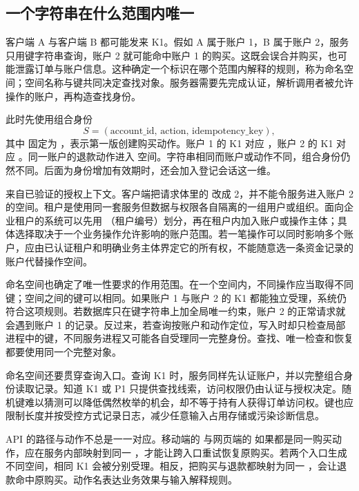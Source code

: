 \subsection*{一个字符串在什么范围内唯一}

客户端 A 与客户端 B 都可能发来 K1。假如 A 属于账户 1，B 属于账户 2，服务只用键字符串查询，账户 2 就可能命中账户 1 的购买。这既会误合并购买，也可能泄露订单与账户信息。这种确定一个标识在哪个范围内解释的规则，称为命名空间；空间名称与键共同决定查找对象。服务器需要先完成认证，解析调用者被允许操作的账户，再构造查找身份。

此时先使用组合身份
\[
 S=(\mathrm{account\_id},\,\mathrm{action},\,\mathrm{idempotency\_key}),
\]
其中  固定为 ，表示第一版创建购买动作。账户 1 的 K1 对应 ，账户 2 的 K1 对应 。同一账户的退款动作进入  空间。字符串相同而账户或动作不同，组合身份仍然不同。后面为身份增加有效期时，还会加入登记会话这一维。

 来自已验证的授权上下文。客户端把请求体里的  改成 2，并不能令服务进入账户 2 的空间。租户是使用同一套服务但数据与权限各自隔离的一组用户或组织。面向企业租户的系统可以先用 （租户编号）划分，再在租户内加入账户或操作主体；具体选择取决于一个业务操作允许影响的账户范围。若一笔操作可以同时影响多个账户，应由已认证租户和明确业务主体界定它的所有权，不能随意选一条资金记录的账户代替操作空间。



命名空间也确定了唯一性要求的作用范围。在一个空间内，不同操作应当取得不同键；空间之间的键可以相同。如果账户 1 与账户 2 的 K1 都能独立受理，系统仍符合这项规则。若数据库只在键字符串上加全局唯一约束，账户 2 的正常请求就会遇到账户 1 的记录。反过来，若查询按账户和动作定位，写入时却只检查局部进程中的键，不同服务进程又可能各自受理同一完整身份。查找、唯一检查和恢复都要使用同一个完整对象。

命名空间还要贯穿查询入口。查询 K1 时，服务同样先认证账户，并以完整组合身份读取记录。知道 K1 或 P1 只提供查找线索，访问权限仍由认证与授权决定。随机键难以猜测可以降低偶然枚举的机会，却不等于持有人获得订单访问权。键也应限制长度并按受控方式记录日志，减少任意输入占用存储或污染诊断信息。

API 的路径与动作不总是一一对应。移动端的  与网页端的  如果都是同一购买动作，应在服务内部映射到同一 ，才能让跨入口重试恢复原购买。若两个入口生成不同空间，相同 K1 会被分别受理。相反，把购买与退款都映射为同一 ，会让退款命中原购买。动作名表达业务效果与输入解释规则。

